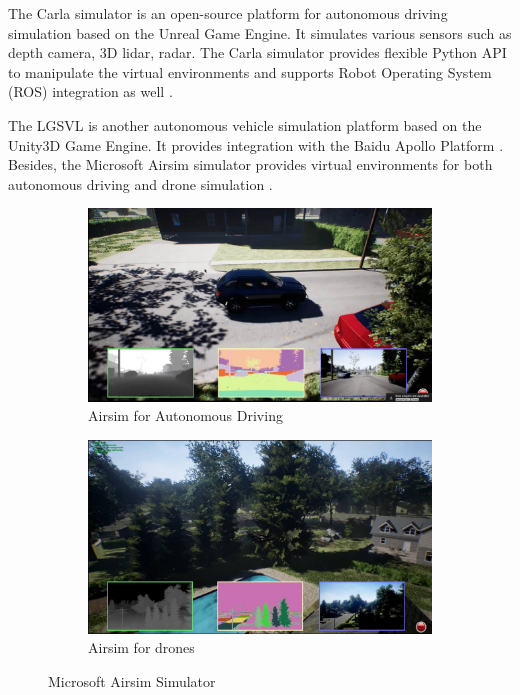 The Carla simulator is an open-source platform for autonomous driving simulation based on the Unreal Game Engine. It simulates various sensors such as depth camera, 3D lidar, radar. The Carla simulator provides flexible Python API to manipulate the virtual environments and supports Robot Operating System (ROS) integration as well \citep{Dosovitskiy17}.

The LGSVL is another autonomous vehicle simulation platform based on the Unity3D Game Engine. It provides integration with the Baidu Apollo Platform \citep{rong2020lgsvl}. Besides, the Microsoft Airsim simulator provides virtual environments for both autonomous driving and drone simulation \citep{airsim2017fsr}.

\begin{figure}[H]
\centering
\begin{subfigure}[b]{0.485\textwidth}
    \centering
    \includegraphics[width=\textwidth]{figures/chapter_intro/airsim_car.jpg}
    \caption{Airsim for Autonomous Driving}
    \label{fig:airsim_car}
\end{subfigure}
\hfill
\begin{subfigure}[b]{0.485\textwidth}
    \centering
    \includegraphics[width=\textwidth]{figures/chapter_intro/airsim_drone.jpg}
    \caption{Airsim for drones}
    \label{fig:airsim_drone}
\end{subfigure}
\hfill
\caption{Microsoft Airsim Simulator}
\label{fig.airsim}
\end{figure}

